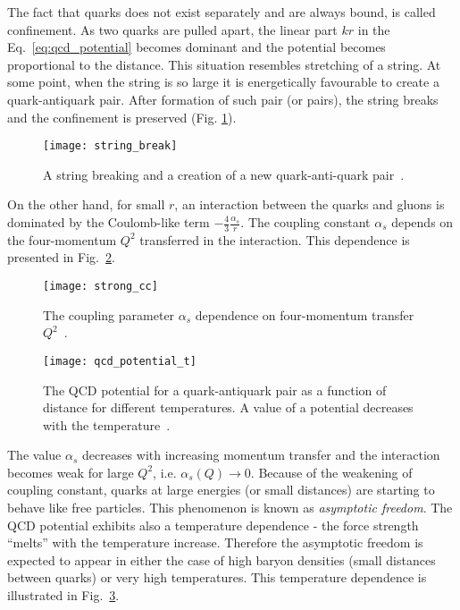       The fact that quarks does not exist separately and are always bound, is called confinement.
      As two quarks are pulled apart, the linear part $kr$ in the Eq.~\ref{eq:qcd_potential} becomes dominant and the potential becomes proportional to the distance.
      This situation resembles stretching of a string.
      At some point, when the string is so large it is energetically favourable to create a quark-antiquark pair.
      After formation of such pair (or pairs), the string breaks and the confinement is preserved (Fig. \ref{fig:string_break}).
      \begin{figure}[h]
        \centering
        \texttt{[image: string\_break]}
        \caption{A string breaking and a creation of a new quark-anti-quark pair~\cite{dfck}.}
        \label{fig:string_break}
      \end{figure}
      
      On the other hand, for small $r$, an interaction between the quarks and gluons is dominated by the Coulomb-like term $-\frac{4}{3} \frac{\alpha_s}{r}$.
      The coupling constant $\alpha_s$ depends on the four-momentum $Q^2$ transferred in the interaction.
      This dependence is presented in Fig.~\ref{fig:strong_cc}.
      \begin{figure}[h]
        \centering
        \texttt{[image: strong\_cc]}
        \caption{The coupling parameter $\alpha_s$ dependence on four-momentum transfer~$Q^2$~\cite{pdg}.}
        \label{fig:strong_cc}
      \end{figure}
      \begin{figure}[h]
        \centering
        \texttt{[image: qcd\_potential\_t]}
        \caption{The QCD potential for a quark-antiquark pair as a function of distance for different temperatures. A value of a potential decreases with the temperature~\cite{dfck}.}
        \label{fig:qcd_potential}
      \end{figure}
      The value $\alpha_s$ decreases with increasing momentum transfer and the interaction becomes weak for large $Q^2$, i.e. $\alpha_s (Q) \to 0$.
      Because of the weakening of coupling constant, quarks at large energies (or small distances) are starting to behave like free particles.
      This phenomenon is known as \textit{asymptotic freedom}.      
      The QCD potential exhibits also a temperature dependence - the force strength ``melts'' with the temperature increase.
      Therefore the asymptotic freedom is expected to appear in either the case of high baryon densities (small distances between quarks) or very high temperatures.
      This temperature dependence is illustrated in Fig.~\ref{fig:qcd_potential}.
      
